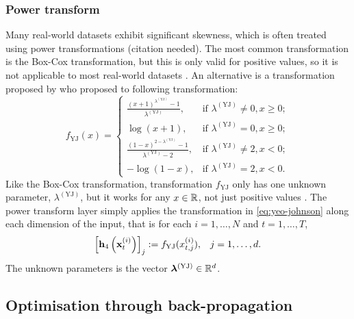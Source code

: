 \documentclass{statsmsc}
\begin{document}

\subsubsection{Power transform}%
\label{ssub:Power transform}

Many real-world datasets exhibit significant skewness, which is often treated using power
transformations (citation needed). The most common transformation is the Box-Cox transformation,
but this is only valid for positive values, so it is not applicable to most real-world datasets
\citep{boxcox}. An alternative is a transformation proposed by \citeauthor{yeoJohnson}
who proposed to following transformation:
\begin{equation}\label{eq:yeo-johnson}
    f_{\textrm{YJ}}(x)= \left\{
        \begin{array}{ll}
            \frac{(x+1)^{\lambda^{(\textrm{YJ})}}-1}{\lambda^{(\textrm{YJ})}}, & \textrm{if } \lambda^{(\textrm{YJ})} \neq 0, x \geq 0; \\
            \log(x + 1), & \textrm{if } \lambda^{(\textrm{YJ})} = 0, x \geq 0;  \\
            \frac{(1-x)^{2-\lambda^{(\textrm{YJ})}}-1}{\lambda^{(\textrm{YJ})}-2} , & \textrm{if } \lambda^{(\textrm{YJ})} \neq 2, x < 0; \\
            -\log(1-x), & \textrm{if } \lambda^{(\textrm{YJ})}=2, x < 0.
        \end{array}
    \right.
\end{equation}
Like the Box-Cox transformation, transformation $f_{\textrm{YJ}}$ only has one unknown parameter, $\lambda^{(\textrm{YJ})}$, but
it works for any $x \in \mathbb{R}$, not just positive values \citep{yeoJohnson}.
The power transform layer simply applies the transformation in \cref{eq:yeo-johnson} along each dimension of the input, that is for each $i=1,\dots,N$ and $t=1,\dots,T$,
\begin{equation}
    \left[\mathbf{h}_4\left(\mathbf{x}_t^{(i)}\right)\right]_j:=f_{\textrm{YJ}}(x_{t,j}^{(i)}), \;\;\; j=1,\dots,d.
\end{equation}
The unknown parameters is the vector $\bm\lambda^{(\textrm{YJ})} \in \mathbb{R}^d$.



\subsection{Optimisation through back-propagation}%
\label{sub:Optimising the parameters}
\end{document}
